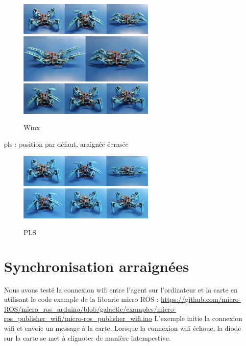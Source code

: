 \begin{figure}[H]
	\begin{center}
		\includegraphics[width=0.6\textwidth]{./img/winx_1}
		\includegraphics[width=0.6\textwidth]{./img/winx_2}
		\includegraphics[width=0.6\textwidth]{./img/winx_3}
		\caption{Winx}
	\end{center}
\end{figure}

pls : position par défaut, araignée écrasée

\begin{figure}[H]
	\begin{center}
		\includegraphics[width=0.6\textwidth]{./img/pls_1}
		\includegraphics[width=0.6\textwidth]{./img/pls_2}
		\caption{PLS}
	\end{center}
\end{figure}

		\section{Synchronisation arraignées}

Nous avons testé la connexion wifi entre l'agent sur l'ordinateur et la carte en utilisant le code example de la librarie micro ROS :
\url{https://github.com/micro-ROS/micro_ros_arduino/blob/galactic/examples/micro-ros_publisher_wifi/micro-ros_publisher_wifi.ino}
L'exemple initie la connexion wifi et envoie un message à la carte.
Lorsque la connexion wifi échoue, la diode sur la carte se met à clignoter de manière intempestive.
\linebreak

